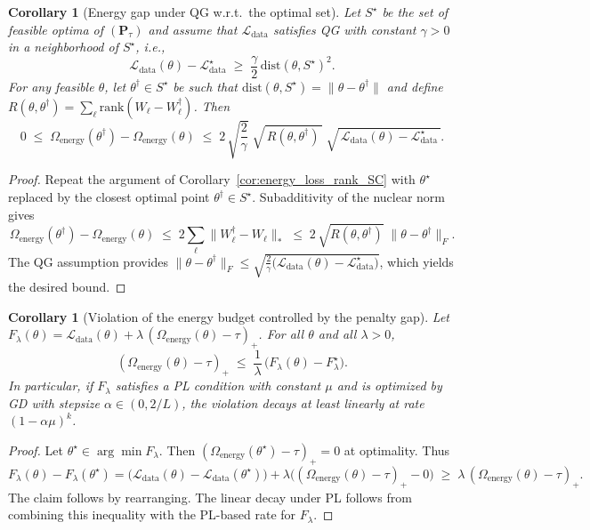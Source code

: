 \documentclass[a4paper,fleqn]{cas-sc}
\newtheorem{corollary}[theorem]{Corollary}
\theoremstyle{remark}
\theoremstyle{definition}
\begin{document}
\begin{corollary}[Energy gap under QG w.r.t.\ the optimal set]\label{cor:energy_loss_QG}
Let $S^\star$ be the set of feasible optima of $(\mathbf{P}_\tau)$ and assume that
$\mathcal{L}_{\text{data}}$ satisfies QG with constant $\gamma>0$
in a neighborhood of $S^\star$, i.e.,
\[
  \mathcal{L}_{\text{data}}(\theta)-\mathcal{L}_{\text{data}}^\star
  \;\ge\; \frac{\gamma}{2}\,\mathrm{dist}(\theta,S^\star)^2.
\]
For any feasible $\theta$, let $\theta^\dagger\in S^\star$ be such that
$\mathrm{dist}(\theta,S^\star)=\|\theta-\theta^\dagger\|$ and define
$R(\theta,\theta^\dagger)=\sum_\ell \mathrm{rank}(W_\ell-W_\ell^\dagger)$. Then
\[
  0 \;\le\; \Omega_{\text{energy}}(\theta^\dagger)-\Omega_{\text{energy}}(\theta)
  \;\le\; 2\,\sqrt{\frac{2}{\gamma}}\;\sqrt{\,R(\theta,\theta^\dagger)\,}\;
           \sqrt{\,\mathcal{L}_{\text{data}}(\theta)-\mathcal{L}_{\text{data}}^\star\,}.
\]
\end{corollary}

\begin{proof}
Repeat the argument of Corollary~\ref{cor:energy_loss_rank_SC} with $\theta^\star$ replaced by the closest optimal point $\theta^\dagger\in S^\star$.
Subadditivity of the nuclear norm gives
\[
  \Omega_{\text{energy}}(\theta^\dagger)-\Omega_{\text{energy}}(\theta)
  \;\le\; 2\sum_\ell \|W_\ell^\dagger - W_\ell\|_{\ast}
  \;\le\; 2\,\sqrt{R(\theta,\theta^\dagger)}\;\|\theta-\theta^\dagger\|_F.
\]
The QG assumption provides $\|\theta-\theta^\dagger\|_F \le \sqrt{\tfrac{2}{\gamma}\big(\mathcal{L}_{\text{data}}(\theta)-\mathcal{L}_{\text{data}}^\star\big)}$, which yields the desired bound.
\end{proof}

\begin{corollary}[Violation of the energy budget controlled by the penalty gap]\label{cor:violation_penalty}
Let $F_\lambda(\theta)=\mathcal{L}_{\text{data}}(\theta)+\lambda\,(\Omega_{\text{energy}}(\theta)-\tau)_+$. For all $\theta$ and all $\lambda>0$,
\[
  (\Omega_{\text{energy}}(\theta)-\tau)_+
  \;\le\; \frac{1}{\lambda}\,\big(F_\lambda(\theta)-F_\lambda^\star\big).
\]
In particular, if $F_\lambda$ satisfies a PL condition with constant $\mu$ and is optimized by GD with stepsize $\alpha\in(0,2/L)$, the violation decays at least linearly at rate $(1-\alpha\mu)^k$.
\end{corollary}

\begin{proof}
Let $\theta^\star\in\arg\min F_\lambda$. Then $(\Omega_{\text{energy}}(\theta^\star)-\tau)_+=0$ at optimality. Thus
\[
  F_\lambda(\theta)-F_\lambda(\theta^\star)
  = \big(\mathcal{L}_{\text{data}}(\theta)-\mathcal{L}_{\text{data}}(\theta^\star)\big)
        + \lambda\big((\Omega_{\text{energy}}(\theta)-\tau)_+ - 0\big)
  \;\ge\; \lambda\,(\Omega_{\text{energy}}(\theta)-\tau)_+.
\]
The claim follows by rearranging. The linear decay under PL follows from combining this inequality with the PL-based rate for $F_\lambda$.
\end{proof}
\end{document}

